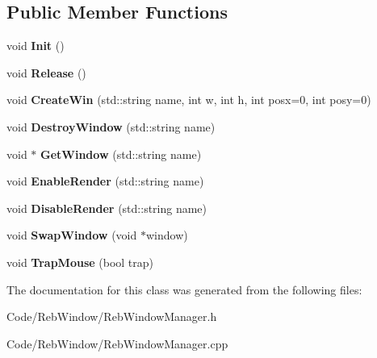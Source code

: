\subsection*{Public Member Functions}
\begin{DoxyCompactItemize}
\item 
void {\bfseries Init} ()\hypertarget{class_reb_window_manager_aa92db91c430835b647802be747d57289}{}\label{class_reb_window_manager_aa92db91c430835b647802be747d57289}

\item 
void {\bfseries Release} ()\hypertarget{class_reb_window_manager_a60bd095a25781b439879738286c94939}{}\label{class_reb_window_manager_a60bd095a25781b439879738286c94939}

\item 
void {\bfseries Create\+Win} (std\+::string name, int w, int h, int posx=0, int posy=0)\hypertarget{class_reb_window_manager_a85a38376e1dcb22105ce887fe2bcb4fd}{}\label{class_reb_window_manager_a85a38376e1dcb22105ce887fe2bcb4fd}

\item 
void {\bfseries Destroy\+Window} (std\+::string name)\hypertarget{class_reb_window_manager_ab5bbd8f9fbf48057c624863ceac51c9d}{}\label{class_reb_window_manager_ab5bbd8f9fbf48057c624863ceac51c9d}

\item 
void $\ast$ {\bfseries Get\+Window} (std\+::string name)\hypertarget{class_reb_window_manager_a5074b3645b93417dc975289bff2f7ed4}{}\label{class_reb_window_manager_a5074b3645b93417dc975289bff2f7ed4}

\item 
void {\bfseries Enable\+Render} (std\+::string name)\hypertarget{class_reb_window_manager_aae2f39c7c7ffca3773da023fc554a713}{}\label{class_reb_window_manager_aae2f39c7c7ffca3773da023fc554a713}

\item 
void {\bfseries Disable\+Render} (std\+::string name)\hypertarget{class_reb_window_manager_a7ae295116d35df85660df801927d3fff}{}\label{class_reb_window_manager_a7ae295116d35df85660df801927d3fff}

\item 
void {\bfseries Swap\+Window} (void $\ast$window)\hypertarget{class_reb_window_manager_a8a0dcb48a89f2f4e967b80cf8e810ba0}{}\label{class_reb_window_manager_a8a0dcb48a89f2f4e967b80cf8e810ba0}

\item 
void {\bfseries Trap\+Mouse} (bool trap)\hypertarget{class_reb_window_manager_aed665b8ccfda8c6da1f9a14f03c79584}{}\label{class_reb_window_manager_aed665b8ccfda8c6da1f9a14f03c79584}

\end{DoxyCompactItemize}


The documentation for this class was generated from the following files\+:\begin{DoxyCompactItemize}
\item 
Code/\+Reb\+Window/Reb\+Window\+Manager.\+h\item 
Code/\+Reb\+Window/Reb\+Window\+Manager.\+cpp\end{DoxyCompactItemize}
